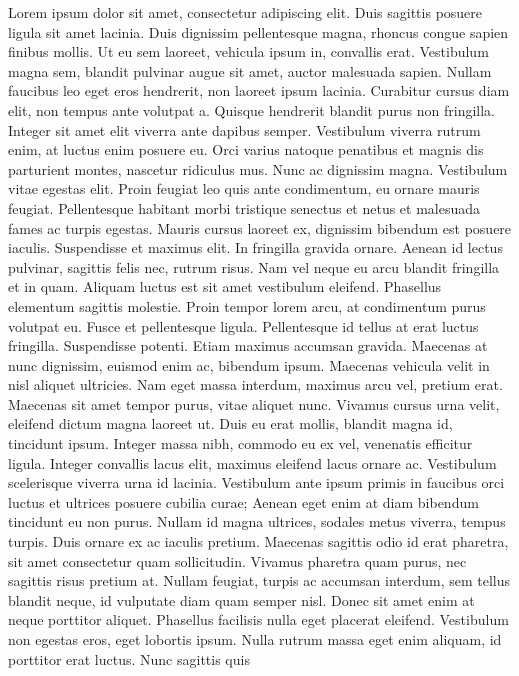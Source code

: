 \documentclass[
  a4paper,
  DIV=11,
  numbers=noendperiod]{scrreprt}
\begin{document}
Lorem ipsum dolor sit amet, consectetur adipiscing elit. Duis sagittis
posuere ligula sit amet lacinia. Duis dignissim pellentesque magna,
rhoncus congue sapien finibus mollis. Ut eu sem laoreet, vehicula ipsum
in, convallis erat. Vestibulum magna sem, blandit pulvinar augue sit
amet, auctor malesuada sapien. Nullam faucibus leo eget eros hendrerit,
non laoreet ipsum lacinia. Curabitur cursus diam elit, non tempus ante
volutpat a. Quisque hendrerit blandit purus non fringilla. Integer sit
amet elit viverra ante dapibus semper. Vestibulum viverra rutrum enim,
at luctus enim posuere eu. Orci varius natoque penatibus et magnis dis
parturient montes, nascetur ridiculus mus. Nunc ac dignissim magna.
Vestibulum vitae egestas elit. Proin feugiat leo quis ante condimentum,
eu ornare mauris feugiat. Pellentesque habitant morbi tristique senectus
et netus et malesuada fames ac turpis egestas. Mauris cursus laoreet ex,
dignissim bibendum est posuere iaculis. Suspendisse et maximus elit. In
fringilla gravida ornare. Aenean id lectus pulvinar, sagittis felis nec,
rutrum risus. Nam vel neque eu arcu blandit fringilla et in quam.
Aliquam luctus est sit amet vestibulum eleifend. Phasellus elementum
sagittis molestie. Proin tempor lorem arcu, at condimentum purus
volutpat eu. Fusce et pellentesque ligula. Pellentesque id tellus at
erat luctus fringilla. Suspendisse potenti. Etiam maximus accumsan
gravida. Maecenas at nunc dignissim, euismod enim ac, bibendum ipsum.
Maecenas vehicula velit in nisl aliquet ultricies. Nam eget massa
interdum, maximus arcu vel, pretium erat. Maecenas sit amet tempor
purus, vitae aliquet nunc. Vivamus cursus urna velit, eleifend dictum
magna laoreet ut. Duis eu erat mollis, blandit magna id, tincidunt
ipsum. Integer massa nibh, commodo eu ex vel, venenatis efficitur
ligula. Integer convallis lacus elit, maximus eleifend lacus ornare ac.
Vestibulum scelerisque viverra urna id lacinia. Vestibulum ante ipsum
primis in faucibus orci luctus et ultrices posuere cubilia curae; Aenean
eget enim at diam bibendum tincidunt eu non purus. Nullam id magna
ultrices, sodales metus viverra, tempus turpis. Duis ornare ex ac
iaculis pretium. Maecenas sagittis odio id erat pharetra, sit amet
consectetur quam sollicitudin. Vivamus pharetra quam purus, nec sagittis
risus pretium at. Nullam feugiat, turpis ac accumsan interdum, sem
tellus blandit neque, id vulputate diam quam semper nisl. Donec sit amet
enim at neque porttitor aliquet. Phasellus facilisis nulla eget placerat
eleifend. Vestibulum non egestas eros, eget lobortis ipsum. Nulla rutrum
massa eget enim aliquam, id porttitor erat luctus. Nunc sagittis quis
\end{document}
